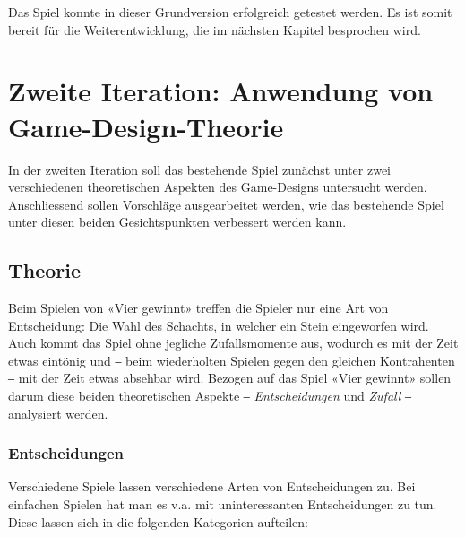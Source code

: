 \documentclass[a4paper,11pt,hidelinks]{scrartcl}
\begin{document}
Das Spiel konnte in dieser Grundversion erfolgreich getestet werden. Es ist somit bereit für die Weiterentwicklung, die im nächsten Kapitel besprochen wird.

\newpage

\section{Zweite Iteration: Anwendung von Game-Design-Theorie}

In der zweiten Iteration soll das bestehende Spiel zunächst unter zwei verschiedenen theoretischen Aspekten des Game-Designs untersucht werden. Anschliessend sollen Vorschläge ausgearbeitet werden, wie das bestehende Spiel unter diesen beiden Gesichtspunkten verbessert werden kann.

\subsection{Theorie}

Beim Spielen von «Vier gewinnt» treffen die Spieler nur eine Art von Entscheidung: Die Wahl des Schachts, in welcher ein Stein eingeworfen wird. Auch kommt das Spiel ohne jegliche Zufallsmomente aus, wodurch es mit der Zeit etwas eintönig und ‒ beim wiederholten Spielen gegen den gleichen Kontrahenten ‒ mit der Zeit etwas absehbar wird. Bezogen auf das Spiel «Vier gewinnt» sollen darum diese beiden theoretischen Aspekte ‒ \textit{Entscheidungen} und \textit{Zufall} ‒ analysiert werden.

\subsubsection{Entscheidungen}

Verschiedene Spiele lassen verschiedene Arten von Entscheidungen zu. Bei einfachen Spielen hat man es v.a. mit uninteressanten Entscheidungen zu tun. Diese lassen sich in die folgenden Kategorien aufteilen:
\end{document}

